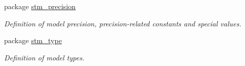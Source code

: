 \begin{CompactItemize}
\item 
package \hyperlink{a00071}{stm\_\-precision}
\begin{CompactList}\small\item\em Definition of model precision, precision-related constants and special values. \item\end{CompactList}

\item 
package \hyperlink{a00072}{stm\_\-type}
\begin{CompactList}\small\item\em Definition of model types. \item\end{CompactList}

\end{CompactItemize}
